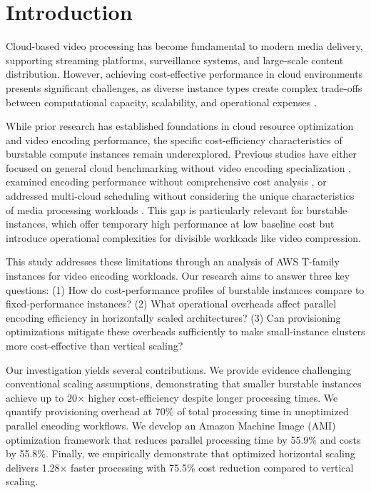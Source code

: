 \documentclass[conference]{IEEEtran}
\begin{document}
	\section{Introduction}
	
	Cloud-based video processing has become fundamental to modern media delivery, supporting streaming platforms, surveillance systems, and large-scale content distribution. However, achieving cost-effective performance in cloud environments presents significant challenges, as diverse instance types create complex trade-offs between computational capacity, scalability, and operational expenses \cite{b1,b17}.
	
	While prior research has established foundations in cloud resource optimization and video encoding performance, the specific cost-efficiency characteristics of burstable compute instances remain underexplored. Previous studies have either focused on general cloud benchmarking without video encoding specialization \cite{b1}, examined encoding performance without comprehensive cost analysis \cite{b3}, or addressed multi-cloud scheduling without considering the unique characteristics of media processing workloads \cite{b20}. This gap is particularly relevant for burstable instances, which offer temporary high performance at low baseline cost but introduce operational complexities for divisible workloads like video compression.
	
	This study addresses these limitations through an analysis of AWS T-family instances for video encoding workloads. Our research aims to answer three key questions: (1) How do cost-performance profiles of burstable instances compare to fixed-performance instances? (2) What operational overheads affect parallel encoding efficiency in horizontally scaled architectures? (3) Can provisioning optimizations mitigate these overheads sufficiently to make small-instance clusters more cost-effective than vertical scaling?
	
	Our investigation yields several contributions. We provide evidence challenging conventional scaling assumptions, demonstrating that smaller burstable instances achieve up to 20× higher cost-efficiency despite longer processing times. We quantify provisioning overhead at 70\% of total processing time in unoptimized parallel encoding workflows. We develop an Amazon Machine Image (AMI) optimization framework that reduces parallel processing time by 55.9\% and costs by 55.8\%. Finally, we empirically demonstrate that optimized horizontal scaling delivers 1.28× faster processing with 75.5\% cost reduction compared to vertical scaling.
	
\end{document}
